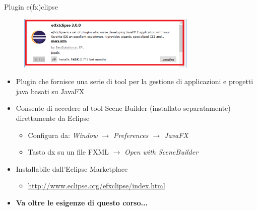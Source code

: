 \documentclass[presentation]{beamer}
\begin{document}
\begin{frame}{Plugin e(fx)clipse}
\begin{figure}
\includegraphics[width=0.76\textwidth]{img/plugin-install.png}
\end{figure}
\begin{itemize}\itemsep5pt
\item Plugin che fornisce una serie di tool per la gestione di applicazioni e progetti java basati su JavaFX
\item Consente di accedere al tool Scene Builder (installato separatamente) direttamente da Eclipse
	\begin{itemize}
	\item Configura da: \emph{Window $\to$ Preferences $\to$ JavaFX}
	\item Tasto dx su un file FXML $\to$ \emph{Open with SceneBuilder}
	\end{itemize}
\item Installabile dall'Eclipse Marketplace
\begin{itemize}
\item \url{http://www.eclipse.org/efxclipse/index.html}
\end{itemize}
\item \textbf{Va oltre le esigenze di questo corso...}
\end{itemize}
\end{frame}



%
\end{document}
